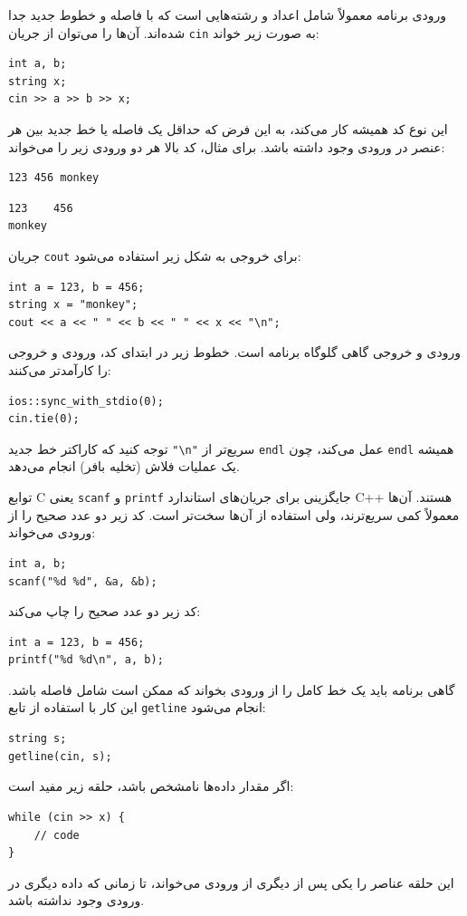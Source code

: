 ورودی برنامه معمولاً شامل اعداد و رشته‌هایی است که با فاصله و خطوط جدید جدا شده‌اند. آن‌ها را می‌توان از جریان \texttt{cin} به صورت زیر خواند:

\begin{lstlisting}
int a, b;
string x;
cin >> a >> b >> x;
\end{lstlisting}

این نوع کد همیشه کار می‌کند، به این فرض که حداقل یک فاصله یا خط جدید بین هر عنصر در ورودی وجود داشته باشد. برای مثال، کد بالا هر دو ورودی زیر را می‌خواند:
\begin{lstlisting}
123 456 monkey
\end{lstlisting}
\begin{lstlisting}
123    456
monkey
\end{lstlisting}
جریان \texttt{cout} برای خروجی به شکل زیر استفاده می‌شود:
\begin{lstlisting}
int a = 123, b = 456;
string x = "monkey";
cout << a << " " << b << " " << x << "\n";
\end{lstlisting}

ورودی و خروجی گاهی گلوگاه برنامه است. خطوط زیر در ابتدای کد، ورودی و خروجی را کارآمدتر می‌کنند:

\begin{lstlisting}
ios::sync_with_stdio(0);
cin.tie(0);
\end{lstlisting}

توجه کنید که کاراکتر خط جدید \texttt{"\textbackslash n"} سریع‌تر از \texttt{endl} عمل می‌کند، چون \texttt{endl} همیشه یک عملیات فلاش (تخلیه بافر) انجام می‌دهد.

توابع C یعنی \texttt{scanf} و \texttt{printf} جایگزینی برای جریان‌های استاندارد C++ هستند. آن‌ها معمولاً کمی سریع‌ترند، ولی استفاده از آن‌ها سخت‌تر است. کد زیر دو عدد صحیح را از ورودی می‌خواند:
\begin{lstlisting}
int a, b;
scanf("%d %d", &a, &b);
\end{lstlisting}
کد زیر دو عدد صحیح را چاپ می‌کند:
\begin{lstlisting}
int a = 123, b = 456;
printf("%d %d\n", a, b);
\end{lstlisting}

گاهی برنامه باید یک خط کامل را از ورودی بخواند که ممکن است شامل فاصله باشد. این کار با استفاده از تابع \texttt{getline} انجام می‌شود:

\begin{lstlisting}
string s;
getline(cin, s);
\end{lstlisting}

اگر مقدار داده‌ها نامشخص باشد، حلقه زیر مفید است:
\begin{lstlisting}
while (cin >> x) {
    // code
}
\end{lstlisting}
این حلقه عناصر را یکی پس از دیگری از ورودی می‌خواند، تا زمانی که داده دیگری در ورودی وجود نداشته باشد.

